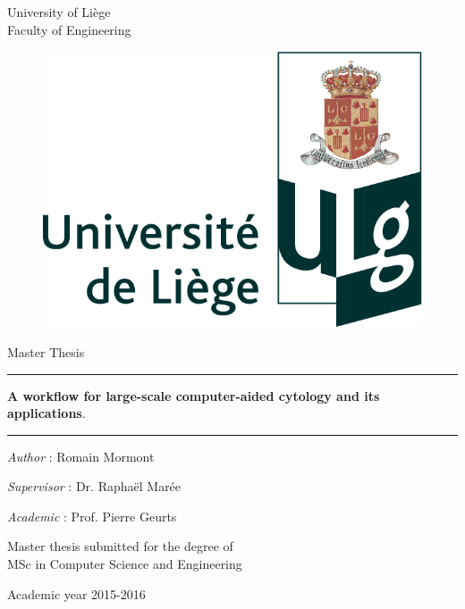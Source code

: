 \thispagestyle{empty}
{ \sf

\begin{center}
	{\small University of Liège}\\
	{\small Faculty of Engineering}
\end{center}

\vfill

\begin{figure}[!h]
	\center
	\includegraphics[scale=0.2]{image/institution_ulg.png}
\end{figure}

\vfill

\begin{center}
	{\LARGE Master Thesis\\}
\end{center}

\noindent\rule{1\linewidth}{1px}

\begin{center}
	{\LARGE \sf \textbf{A workflow for large-scale computer-aided cytology and its applications}.}
\end{center}

\noindent\rule{1\linewidth}{1px}

\begin{center}
	\textit{Author} : Romain Mormont
\end{center}

\begin{center}
	\textit{Supervisor} : Dr. Raphaël Marée
\end{center}

\begin{center}
	\textit{Academic} : Prof. Pierre Geurts
\end{center}
\vfill

\begin{center}
	Master thesis submitted for the degree of \\
	\vspace{0.25cm}
	{\Large MSc in Computer Science and Engineering}
\end{center}

\vfill
\begin{center}
Academic year 2015-2016\\
\end{center}
}